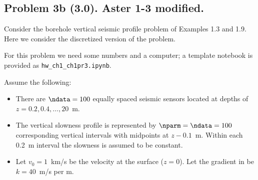 \documentclass[11pt,titlepage,fleqn]{article}
\newcommand{\tfile}{{\tt hw\_ch1\_ch1pr3.ipynb}}
\begin{document}

\pagebreak
\subsection*{Problem 3b (3.0). Aster 1-3 modified.}

Consider the borehole vertical seismic profile problem of Examples 1.3 and 1.9. Here we consider the discretized version of the problem. 

For this problem we need some numbers and a computer; a template notebook is provided as \tfile.

Assume the following:
%
\begin{itemize}
\item There are $\ndata=100$ equally spaced seismic sensors located at depths of $z = 0.2, 0.4, \ldots, 20$~m.
\item The vertical slowness profile is represented by $\nparm=\ndata=100$ corresponding vertical intervals with midpoints at $z - 0.1$~m. Within each 0.2~m interval the slowness is assumed to be constant.
\item Let $v_0 = 1$~km/s be the velocity at the surface ($z=0$). Let the gradient in  be $k = 40$~m/s per m.
\end{itemize}
\end{document}
